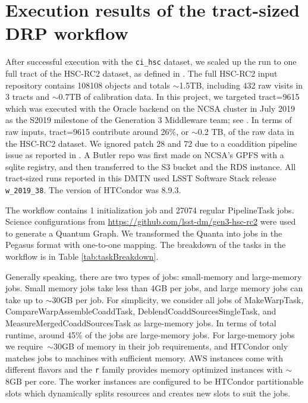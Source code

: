 \section{Execution results of the tract-sized DRP workflow}
\label{sec:results}

After successful execution with the \texttt{ci\_hsc} dataset, we scaled up the run to one full tract of the HSC-RC2 dataset, as defined in .
The full HSC-RC2 input repository contains 108108 objects and totals $\sim$1.5TB, including 432 raw visits in 3 tracts and $\sim$0.7TB of calibration data.
In this project, we targeted tract=9615 which was executed with the Oracle backend on the NCSA cluster in July 2019 as the S2019 milestone of the Generation 3 Middleware team; see .
In terms of raw inputs, tract=9615 contribute around 26$\%$, or $\sim$0.2 TB, of the raw data in the HSC-RC2 dataset.
We ignored patch 28 and 72 due to a coaddition pipeline issue as reported in .
A Butler repo was first made on NCSA's GPFS with a sqlite registry, and then transferred to the S3 bucket and the RDS instance.
All tract-sized runs reported in this DMTN used LSST Software Stack release \texttt{w\_2019\_38}.
The version of HTCondor was 8.9.3.

The workflow contains 1 initialization job and 27074 regular PipelineTask jobs.
Science configurations from \url{https://github.com/lsst-dm/gen3-hsc-rc2} were used to generate a Quantum Graph.
We transformed the Quanta into jobs in the Pegasus format with one-to-one mapping.
The breakdown of the tasks in the workflow is in Table \ref{tab:taskBreakdown}.



Generally speaking, there are two types of jobs: small-memory and large-memory jobs.
Small memory jobs take less than 4GB per jobs, and large memory jobs can take up to $\sim$30GB per job.
For simplicity, we consider all jobs of MakeWarpTask, CompareWarpAssembleCoaddTask, DeblendCoaddSourcesSingleTask, and MeasureMergedCoaddSourcesTask as large-memory jobs.
In terms of total runtime, around 45\% of the jobs are large-memory jobs.
For large-memory jobs we require~$\sim$30GB of memory in their job requirements, and HTCondor only matches jobs to machines with sufficient memory.
AWS instances come with different flavors and the \texttt{r} family provides memory optimized instances with $\sim$8GB per core.
The worker instances are configured to be HTCondor partitionable slots which dynamically splits resources and creates new slots to suit the jobs.

